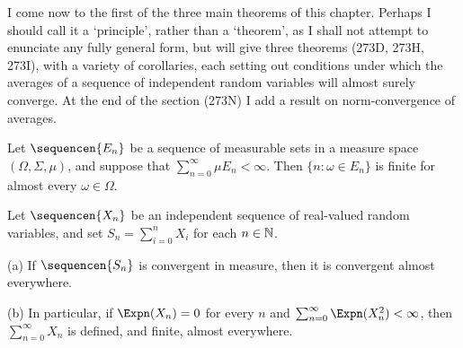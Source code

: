 
\def\chaptername{Probability theory}
\def\sectionname{The strong law of large numbers}


I come now to the first of the three main theorems of this chapter.
Perhaps I should call it a `principle', rather than a `theorem',
as I shall not attempt to enunciate any fully general form, but will
give three theorems (273D, 273H, 273I), with a variety of
corollaries, each setting out conditions under which the averages of a
sequence of independent random variables will almost surely converge.
At the end of the section (273N) I add a result on norm-convergence of
averages.

 Let $\sequencen{E_n}$ be a sequence of measurable
sets in a measure space $(\Omega,\Sigma,\mu)$, and suppose that
$\sum_{n=0}^{\infty}\mu E_n<\infty$.   Then  $\{n:\omega\in E_n\}$ is
finite for almost every $\omega\in\Omega$.


 Let $\sequencen{X_n}$ be an independent sequence of
real-valued random variables, and set $S_n=\sum_{i=0}^nX_i$ for each
$n\in\Bbb N$.

(a) If $\sequencen{S_n}$ is convergent in measure, then it is convergent
almost everywhere.

(b) In particular, if $\Expn(X_n)=0$ for every $n$ and
$\sum_{n=0}^{\infty}\Expn(X_n^2)<\infty$, then
$\sum_{n=0}^{\infty}X_n$ is defined, and finite, almost everywhere.

